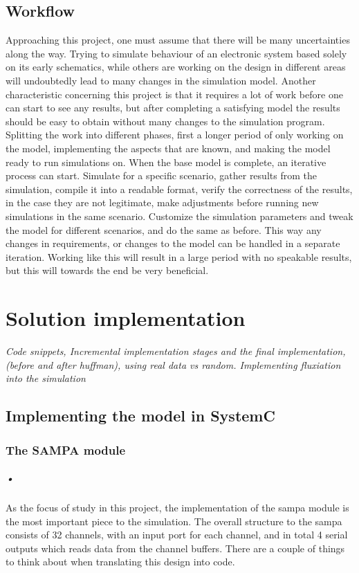 \documentclass[a4paper, 12pt]{report}
\begin{document}
\section{Workflow}
Approaching this project, one must assume that there will be many uncertainties along the way.
Trying to simulate behaviour of an electronic system based solely on its early schematics, while others are working on the design in different areas will undoubtedly lead to many changes in the simulation model.
Another characteristic concerning this project is that it requires a lot of work before one can start to see any results, but after completing a satisfying  model the results should be easy to obtain without many changes to the simulation program.
Splitting the work into different phases, first a longer period of only working on the model, implementing the aspects that are known, and making the model ready to run simulations on.
When the base model is complete, an iterative process can start.
Simulate for a specific scenario, gather results from the simulation, compile it into a readable format, verify the correctness of the results, in the case they are not legitimate, make adjustments before running new simulations in the same scenario.
Customize the simulation parameters and tweak the model for different scenarios, and do the same as before.
This way any changes in requirements, or changes to the model can be handled in a separate iteration.
Working like this will result in a large period with no speakable results, but this will towards the end be very beneficial.

\chapter{Solution implementation}
\textit{Code snippets, Incremental implementation stages and the final implementation, (before and after huffman), using real data vs random. Implementing fluxiation into the simulation}
\section{Implementing the model in SystemC}

\subsection{The SAMPA module}

\paragraph{•}
As the focus of study in this project, the implementation of the \gls{sampa} module is the most important piece to the simulation.
The overall structure to the \gls{sampa} consists of 32 channels, with an input port for each channel, and in total 4 serial outputs which reads data from the channel buffers.
There are a couple of things to think about when translating this design into code.
\end{document}
